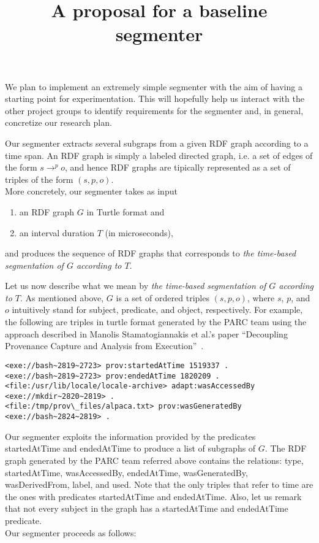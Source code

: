 \documentclass{article}
\begin{document}
\title{A proposal for a baseline segmenter}
\maketitle

We plan to implement an extremely simple segmenter with the aim
of having a starting point for experimentation. This will hopefully
help us interact with the other project groups to identify requirements
for the segmenter and, in general, 
concretize our research plan.

Our segmenter extracts several subgraps from a given 
RDF graph according to a time span.
An RDF graph is simply a labeled directed graph, 
i.e. a set of edges of the form $s \to^p o$,
and hence RDF graphs are tipically represented 
as a set of triples of the form $(s,p,o)$.
\\[2ex]
More concretely, our segmenter takes as input
\begin{enumerate}
\item an RDF graph $G$ in Turtle format and
\item an interval duration $T$ (in microseconds),
\end{enumerate}
and produces the sequence of RDF graphs that corresponds to {\em the time-based segmentation of $G$ according to $T$}.

Let us now describe what we mean by {\em the time-based segmentation of $G$ according to $T$}.
As mentioned above, $G$ is a set of ordered triples $(s, p, o)$,
where $s$, $p$, and $o$ intuitively stand for subject, predicate, and object, respectively.
For example, the following are triples in turtle format
generated by the PARC team using the approach described in 
Manolis Stamatogiannakis et al.'s paper ``Decoupling Provenance Capture and
Analysis from Execution''~\cite{stamatogiannakis15tapp}.

{\scriptsize
\begin{verbatim}
<exe://bash~2819~2723> prov:startedAtTime 1519337 .
<exe://bash~2819~2723> prov:endedAtTime 1820209 . 
<file:/usr/lib/locale/locale-archive> adapt:wasAccessedBy <exe://mkdir~2820~2819> . 
<file:/tmp/prov\_files/alpaca.txt> prov:wasGeneratedBy <exe://bash~2824~2819> .
\end{verbatim}
}

Our segmenter exploits the information provided 
by the predicates startedAtTime and endedAtTime
to produce a list of subgraphs of $G$.
The RDF graph generated by the PARC team referred above
contains the relations: 
type, startedAtTime,
wasAccessedBy,
endedAtTime,
wasGeneratedBy,
wasDerivedFrom,
label, and
used.
Note that the only triples that refer to time 
are the ones with predicates
startedAtTime and endedAtTime.
Also, let us remark that not every 
subject in the graph has a 
startedAtTime and endedAtTime
predicate.
\\[2ex]
Our segmenter proceeds as follows:
\end{document}
